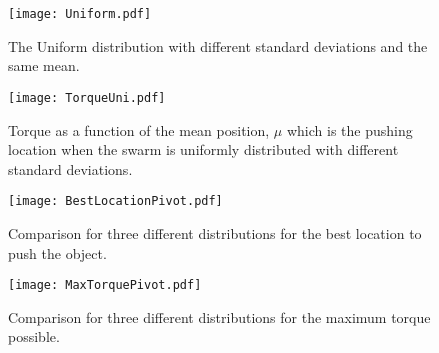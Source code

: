 \begin{figure}
\begin{center}
	\texttt{[image: Uniform.pdf]}
\end{center}
\vspace{-1em}
\caption{\label{fig:pdfUni}
The Uniform distribution with different standard deviations and the same mean.
}
\vspace{-1em}
\end{figure}

\begin{figure}
\begin{center}
	\texttt{[image: TorqueUni.pdf]}
\end{center}
\vspace{-1em}
\caption{\label{fig:torqueUni}
Torque as a function of the mean position, $\mu$ which is the pushing location when the swarm is uniformly distributed with different standard deviations.
}
\vspace{-1em}
\end{figure}

\begin{figure}
\begin{center}
	\texttt{[image: BestLocationPivot.pdf]}
\end{center}
\vspace{-1em}
\caption{\label{fig:besLocPiv}
Comparison for three different distributions for the best location to push the object.
}
\vspace{-1em}
\end{figure}

\begin{figure}
\begin{center}
	\texttt{[image: MaxTorquePivot.pdf]}
\end{center}
\vspace{-1em}
\caption{\label{fig:maxTorPiv}
Comparison for three different distributions for the maximum torque possible.
}
\vspace{-1em}
\end{figure}